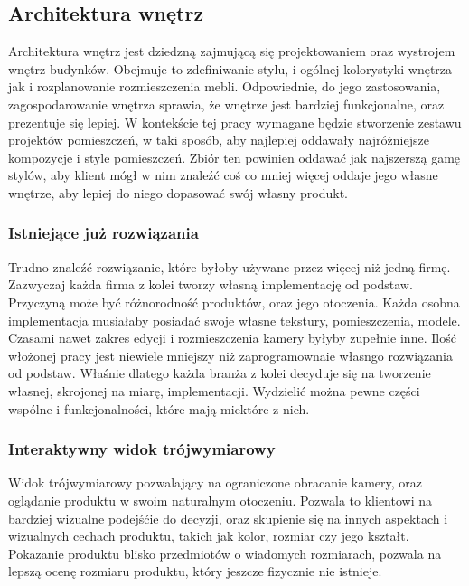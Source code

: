 \documentclass{article} %
\begin{document}
    \subsection{Architektura wnętrz}
        Architektura wnętrz jest dziedzną zajmującą się projektowaniem oraz wystrojem wnętrz budynków. Obejmuje to zdefiniwanie stylu, i ogólnej kolorystyki wnętrza jak i rozplanowanie rozmieszczenia mebli. Odpowiednie, do jego zastosowania, zagospodarowanie wnętrza sprawia, że wnętrze jest bardziej funkcjonalne, oraz prezentuje się lepiej. W kontekście tej pracy wymagane będzie stworzenie zestawu projektów pomieszczeń, w taki sposób, aby najlepiej oddawały najróżniejsze kompozycje i style pomieszczeń. Zbiór ten powinien oddawać jak najszerszą gamę stylów, aby klient mógł w nim znaleźć coś co mniej więcej oddaje jego własne wnętrze, aby lepiej do niego dopasować swój własny produkt.
        \\
        
        \subsubsection{Istniejące już rozwiązania}
        Trudno znaleźć rozwiązanie, które byłoby używane przez więcej niż jedną firmę. Zazwyczaj każda firma z kolei tworzy własną implementację od podstaw. Przyczyną może być różnorodność produktów, oraz jego otoczenia. Każda osobna implementacja musiałaby posiadać swoje własne tekstury, pomieszczenia, modele. Czasami nawet zakres edycji i rozmieszczenia kamery byłyby zupełnie inne. Ilość włożonej pracy jest niewiele mniejszy niż zaprogramownaie własngo rozwiązania od podstaw. Właśnie dlatego każda branża z kolei decyduje się na tworzenie własnej, skrojonej na miarę, implementacji. Wydzielić można pewne części wspólne i funkcjonalności, które mają miektóre z nich. 
        \\
        
        
        \subsubsection{Interaktywny widok trójwymiarowy}
        Widok trójwymiarowy pozwalający na ograniczone obracanie kamery, oraz oglądanie produktu w swoim naturalnym otoczeniu. Pozwala to klientowi na bardziej wizualne podejśćie do decyzji, oraz skupienie się na innych aspektach i wizualnych cechach produktu, takich jak kolor, rozmiar czy jego kształt. Pokazanie produktu blisko przedmiotów o wiadomych rozmiarach, pozwala na lepszą ocenę rozmiaru produktu, który jeszcze fizycznie nie istnieje.
        \\
        
\end{document}
